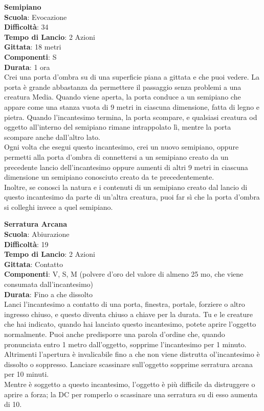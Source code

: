 \begin{multicols}{2}
\medskip\textbf{Semipiano}\\
\textbf{Scuola}: Evocazione\\
\textbf{Difficoltà}: 34\\
\textbf{Tempo di Lancio}: 2 Azioni\\
\textbf{Gittata}: 18 metri\\
\textbf{Componenti}: S\\
\textbf{Durata}: 1 ora\\
Crei una porta d'ombra su di una superficie piana a gittata e che puoi vedere. La porta è grande abbastanza da permettere il passaggio senza problemi a una creatura Media. Quando viene aperta, la porta conduce a un semipiano che appare come una stanza vuota di 9 metri in ciascuna dimensione, fatta di legno e pietra. Quando l'incantesimo termina, la porta scompare, e qualsiasi creatura od oggetto all'interno del semipiano rimane intrappolato lì, mentre la porta scompare anche dall'altro lato.\\
Ogni volta che esegui questo incantesimo, crei un nuovo semipiano, oppure permetti alla porta d'ombra di connettersi a un semipiano creato da un precedente lancio dell'incantesimo oppure aumenti di altri 9 metri in ciascuna dimensione un semipiano conosciuto creato da te precedentemente. \\
Inoltre, se conosci la natura e i contenuti di un semipiano creato dal lancio di questo incantesimo da parte di un'altra creatura, puoi far sì che la porta d'ombra si colleghi invece a quel semipiano.

\medskip\textbf{Serratura Arcana}\\
\textbf{Scuola}: Abiurazione\\
\textbf{Difficoltà}: 19\\
\textbf{Tempo di Lancio}: 2 Azioni\\
\textbf{Gittata}: Contatto\\
\textbf{Componenti}: V, S, M (polvere d'oro del valore di almeno 25 mo, che viene consumata dall'incantesimo) \\
\textbf{Durata}: Fino a che dissolto\\
Lanci l'incantesimo a contatto di una porta, finestra, portale, forziere o altro ingresso chiuso, e questo diventa chiuso a chiave per la durata. Tu e le creature che hai indicato, quando hai lanciato questo incantesimo, potete aprire l'oggetto normalmente. Puoi anche predisporre una parola d'ordine che, quando pronunciata entro 1 metro dall'oggetto, sopprime l'incantesimo per 1 minuto. Altrimenti l'apertura è invalicabile fino a che non viene distrutta ol'incantesimo è dissolto o soppresso. Lanciare scassinare sull'oggetto sopprime serratura arcana per 10 minuti.\\
Mentre è soggetto a questo incantesimo, l'oggetto è più difficile da distruggere o aprire a forza; la DC per romperlo o scassinare una serratura su di esso aumenta di 10.


\end{multicols}
